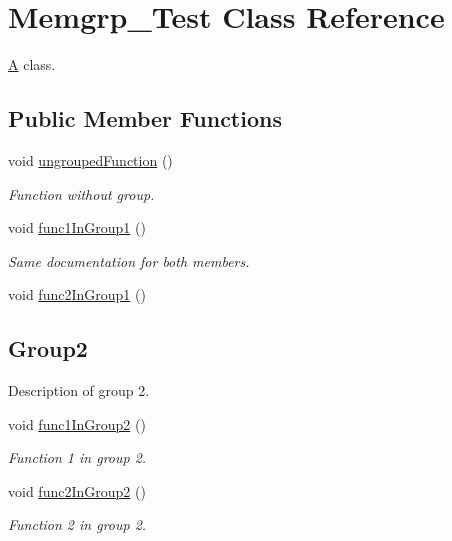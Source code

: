 \hypertarget{class_memgrp___test}{}\section{Memgrp\+\_\+\+Test Class Reference}
\label{class_memgrp___test}


\mbox{\hyperlink{class_a}{A}} class.  


\subsection*{Public Member Functions}
\begin{DoxyCompactItemize}
\item 
void \mbox{\hyperlink{class_memgrp___test_a8a3a4ac34b2e25696159ac420bd4bdc6}{ungrouped\+Function}} ()
\begin{DoxyCompactList}\small\item\em Function without group. \end{DoxyCompactList}\end{DoxyCompactItemize}
\textbf{ }\par
\begin{DoxyCompactItemize}
\item 
void \mbox{\hyperlink{class_memgrp___test_a5052066c03efb51395b5334da4255cd2}{func1\+In\+Group1}} ()
\begin{DoxyCompactList}\small\item\em Same documentation for both members. \end{DoxyCompactList}\item 
void \mbox{\hyperlink{class_memgrp___test_a8296fa2c355e84ecf25522d54807548c}{func2\+In\+Group1}} ()
\end{DoxyCompactItemize}

\subsection*{Group2}
\label{_amgrp6be2faefeff8740e94471f5ae04da6d0}%
Description of group 2. \begin{DoxyCompactItemize}
\item 
void \mbox{\hyperlink{class_memgrp___test_ab0e6553ddc36ac3cef0ac229c5dd4cdb}{func1\+In\+Group2}} ()
\begin{DoxyCompactList}\small\item\em Function 1 in group 2. \end{DoxyCompactList}\item 
void \mbox{\hyperlink{class_memgrp___test_a9ce862049bb543596343e81ad3ddddff}{func2\+In\+Group2}} ()
\begin{DoxyCompactList}\small\item\em Function 2 in group 2. \end{DoxyCompactList}\end{DoxyCompactItemize}


